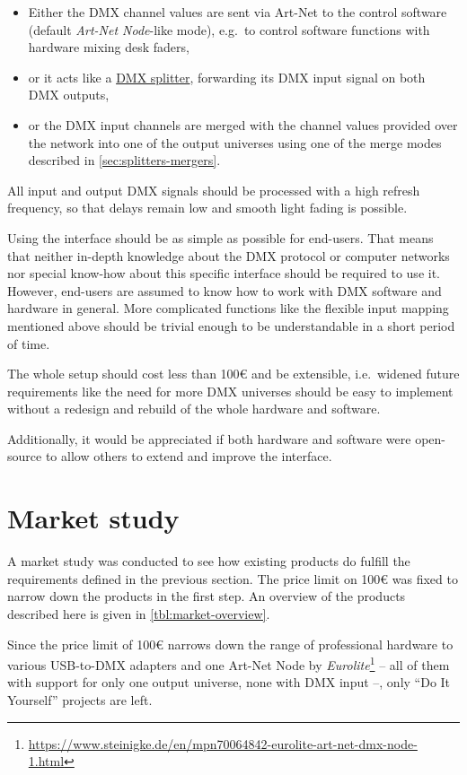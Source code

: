 \begin{itemize}
\tightlist
\item
  Either the DMX channel values are sent via Art-Net to the control
  software (default \emph{Art-Net Node}-like mode), e.g.~to control
  software functions with hardware mixing desk faders,
\item
  or it acts like a \protect\hyperlink{sec:splitters-mergers}{DMX
  splitter}, forwarding its DMX input signal on both DMX outputs,
\item
  or the DMX input channels are merged with the channel values provided
  over the network into one of the output universes using one of the
  merge modes described in \cref{sec:splitters-mergers}.
\end{itemize}

All input and output DMX signals should be processed with a high refresh
frequency, so that delays remain low and smooth light fading is
possible.

Using the interface should be as simple as possible for end-users. That
means that neither in-depth knowledge about the DMX protocol or computer
networks nor special know-how about this specific interface should be
required to use it. However, end-users are assumed to know how to work
with DMX software and hardware in general. More complicated functions
like the flexible input mapping mentioned above should be trivial enough
to be understandable in a short period of time.

The whole setup should cost less than 100\euro{} and be extensible,
i.e.~widened future requirements like the need for more DMX universes
should be easy to implement without a redesign and rebuild of the whole
hardware and software.

Additionally, it would be appreciated if both hardware and software were
open-source to allow others to extend and improve the interface.

\hypertarget{sec:market-study}{\section{Market
study}\label{sec:market-study}}

A market study was conducted to see how existing products do fulfill the
requirements defined in the previous section. The price limit on
100\euro{} was fixed to narrow down the products in the first step. An
overview of the products described here is given in
\cref{tbl:market-overview}.

Since the price limit of 100\euro{} narrows down the range of
professional hardware to various USB-to-DMX adapters and one Art-Net
Node by \emph{Eurolite}\footnote{\url{https://www.steinigke.de/en/mpn70064842-eurolite-art-net-dmx-node-1.html}}
-- all of them with support for only one output universe, none with DMX
input --, only ``Do It Yourself'' projects are left.


